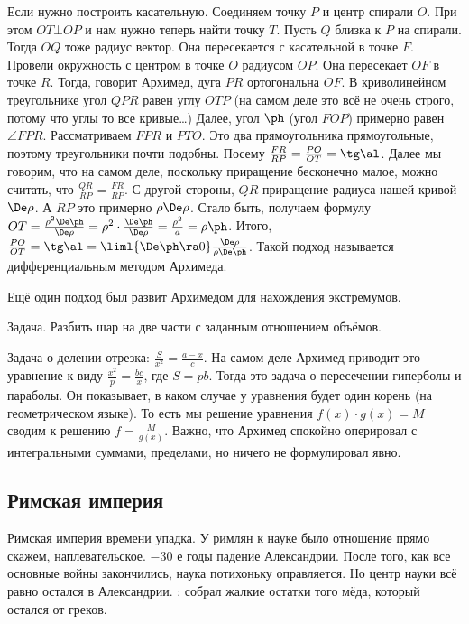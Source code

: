 \documentclass[a4paper,oneside,fleqn,10pt]{article}
\begin{document}
Если нужно построить касательную. Соединяем точку $P$ и центр спирали $O$.
При этом $OT \bot OP$ и нам нужно теперь найти точку $T$.
Пусть $Q$ близка к $P$ на спирали. Тогда $OQ$ тоже радиус вектор. Она пересекается
с касательной в точке $F$. Провели окружность с центром в точке $O$ радиусом $OP$.
Она пересекает $OF$ в точке $R$. Тогда, говорит Архимед, дуга $PR$ ортогональна $OF$.
В криволинейном треугольнике угол $QPR$ равен углу $OTP$ (на самом деле это всё не очень
строго, потому что углы то все кривые\ldots)
Далее, угол $\ph$ (угол $FOP$) примерно равен $\angle FPR$. Рассматриваем $FPR$ и $PTO$.
Это два прямоугольника прямоугольные, поэтому треугольники почти подобны.
Посему $\frac{FR}{RP} = \frac{PO}{OT} = \tg \al$.
Далее мы говорим, что на самом деле, поскольку приращение бесконечно малое,
можно считать, что $\frac{QR}{RP} = \frac{FR}{RP}$. С другой стороны, $QR$ приращение
радиуса нашей кривой $\De\rho$. А $RP$ это примерно $\rho \De\rho$.
Стало быть, получаем формулу $OT = \frac{\rho^2\De\ph}{\De\rho} = \rho^2\cdot \frac{\De\ph}{\De\rho} =
\frac{\rho^2}{a} = \rho\ph$. Итого, $\frac{PO}{OT} = \tg \al = \liml{\De\ph \ra 0} \frac{\De\rho}{\rho \De\ph}$.
Такой подход называется дифференциальным методом Архимеда.

Ещё один подход был развит Архимедом для нахождения экстремумов.

Задача. Разбить шар на две части с заданным отношением объёмов.

Задача о делении отрезка: $\frac{S}{x^2} = \frac{a-x}{c}$.
На самом деле Архимед приводит это уравнение к виду $\frac{x^2}{p} =\frac{bc}{x}$, где $S = pb$.
Тогда это задача о пересечении гиперболы и параболы. Он показывает, в каком случае у уравнения
будет один корень (на геометрическом языке). То есть мы решение уравнения $f(x) \cdot g (x) = M$
сводим к решению $f = \frac{M}{g(x)}$.
Важно, что Архимед спокойно оперировал с интегральными суммами, пределами, но ничего
не формулировал явно.

\subsection{Римская империя}

Римская империя времени упадка. У римлян к науке было отношение прямо скажем, наплевательское.
$-30$ е годы падение Александрии. После того, как все основные войны закончились,
наука потихоньку оправляется. Но центр науки всё равно остался в Александрии.
:  собрал жалкие остатки того мёда, который остался от греков.
\end{document}
